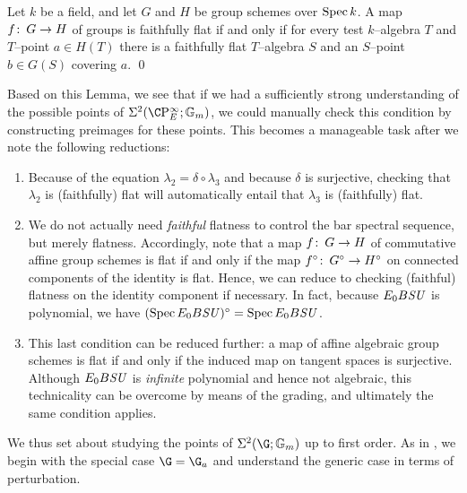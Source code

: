\begin{lemma}
Let \(k\) be a field, and let \(G\) and \(H\) be group schemes over \(\operatorname{Spec} k\).  A map \(f\colon\thinspace G \to H\) of groups is faithfully flat if and only if for every test \(k\)--algebra \(T\) and \(T\)--point \(a \in H(T)\) there is a faithfully flat \(T\)--algebra \(S\) and an \(S\)--point \(b \in G(S)\) covering \(a\). \qed
\end{lemma}

\noindent Based on this Lemma, we see that if we had a sufficiently strong understanding of the possible points of \(\Sigma^2(\CP^\infty_E; \Gm)\), we could manually check this condition by constructing preimages for these points.  This becomes a manageable task after we note the following reductions:
\begin{enumerate}
    \item Because of the equation \(\lambda_2 = \delta \circ \lambda_3\) and because \(\delta\) is surjective, checking that \(\lambda_2\) is (faithfully) flat will automatically entail that \(\lambda_3\) is (faithfully) flat.
    \item We do not actually need \emph{faithful} flatness to control the bar spectral sequence, but merely flatness.  Accordingly, note that a map \(f\colon\thinspace G \to H\) of commutative affine group schemes is flat if and only if the map \(f^\circ\colon\thinspace G^\circ \to H^\circ\) on connected components of the identity is flat.  Hence, we can reduce to checking (faithful) flatness on the identity component if necessary.  In fact, because \(E_0 B\mathit{SU}\) is polynomial, we have \((\operatorname{Spec} E_0 B\mathit{SU})^\circ = \operatorname{Spec} E_0 B\mathit{SU}\).
    \item This last condition can be reduced further: a map of affine algebraic group schemes is flat if and only if the induced map on tangent spaces is surjective.  Although \(E_0 B\mathit{SU}\) is \emph{infinite} polynomial and hence not algebraic, this technicality can be overcome by means of the grading, and ultimately the same condition applies.
\end{enumerate}

We thus set about studying the points of \(\Sigma^2(\G; \Gm)\) up to first order.  As in , we begin with the special case \(\G = \G_a\) and understand the generic case in terms of perturbation.

